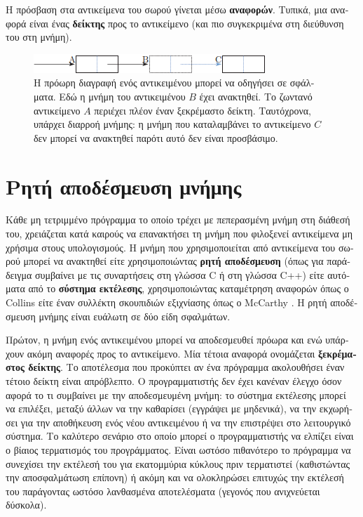 \begin{greek}
Η πρόσβαση στα αντικείμενα του σωρού γίνεται μέσω \textbf{αναφορών}.
Τυπικά, μια αναφορά είναι ένας \textbf{δείκτης} προς το αντικείμενο
(και πιο συγκεκριμένα στη διεύθυνση του στη μνήμη). 

\begin{figure}
  \centering
  \includegraphics{figures/intro_1}
  \caption[Η πρόωρη διαγραφή ενός αντικειμένου μπορεί να οδηγήσει
           σε σφάλματα]
    {Η πρόωρη διαγραφή ενός αντικειμένου μπορεί να οδηγήσει σε
     σφάλματα. Εδώ η μνήμη του αντικειμένου $B$ έχει ανακτηθεί. Το
     ζωντανό αντικείμενο $A$ περιέχει πλέον έναν ξεκρέμαστο δείκτη.
     Ταυτόχρονα, υπάρχει διαρροή μνήμης: η μνήμη που καταλαμβάνει
     το αντικείμενο $C$ δεν μπορεί να ανακτηθεί παρότι αυτό δεν
     είναι προσβάσιμο.}
   \label{fig:intro_1}  
\end{figure}

\section{Ρητή αποδέσμευση μνήμης}
Κάθε μη τετριμμένο πρόγραμμα το οποίο τρέχει με πεπερασμένη μνήμη
στη διάθεσή του, χρειάζεται κατά καιρούς να επανακτήσει τη μνήμη
που φιλοξενεί αντικείμενα μη χρήσιμα στους υπολογισμούς. Η μνήμη
που χρησιμοποιείται από αντικείμενα του σωρού μπορεί να ανακτηθεί
είτε χρησιμοποιώντας \textbf{ρητή αποδέσμευση} (όπως για παράδειγμα
συμβαίνει με τις συναρτήσεις \textenglish{} στη γλώσσα C
ή \textenglish{} στη γλώσσα C++) είτε αυτόματα από το
\textbf{σύστημα εκτέλεσης}, χρησιμοποιώντας καταμέτρηση αναφορών όπως ο
Collins \cite{DBLP:journals/cacm/Collins60} είτε έναν συλλέκτη σκουπιδιών
εξιχνίασης όπως ο McCarthy \cite{DBLP:journals/cacm/McCarthy60}. Η ρητή
αποδέσμευση μνήμης είναι ευάλωτη σε δύο είδη σφαλμάτων.

Πρώτον, η μνήμη ενός αντικειμένου μπορεί να αποδεσμευθεί πρόωρα και
ενώ υπάρχουν ακόμη αναφορές προς το αντικείμενο. Μία τέτοια αναφορά
ονομάζεται \textbf{ξεκρέμαστος δείκτης}. Το αποτέλεσμα που προκύπτει
αν ένα πρόγραμμα ακολουθήσει έναν τέτοιο δείκτη είναι απρόβλεπτο.
Ο προγραμματιστής δεν έχει κανέναν έλεγχο όσον αφορά το τι συμβαίνει
με την αποδεσμευμένη μνήμη: το σύστημα εκτέλεσης μπορεί να επιλέξει,
μεταξύ άλλων να την καθαρίσει (εγγράψει με μηδενικά), να την
εκχωρήσει για την αποθήκευση ενός νέου αντικειμένου ή να την
επιστρέψει στο λειτουργικό σύστημα. Το καλύτερο σενάριο στο οποίο
μπορεί ο προγραμματιστής να ελπίζει είναι ο βίαιος τερματισμός του
προγράμματος. Είναι ωστόσο πιθανότερο το πρόγραμμα να συνεχίσει
την εκτέλεσή του για εκατομμύρια κύκλους πριν τερματιστεί (καθιστώντας
την αποσφαλμάτωση επίπονη) ή ακόμη και να ολοκληρώσει επιτυχώς
την εκτέλεσή του παράγοντας ωστόσο λανθασμένα αποτελέσματα
(γεγονός που ανιχνεύεται δύσκολα).


\end{greek}
